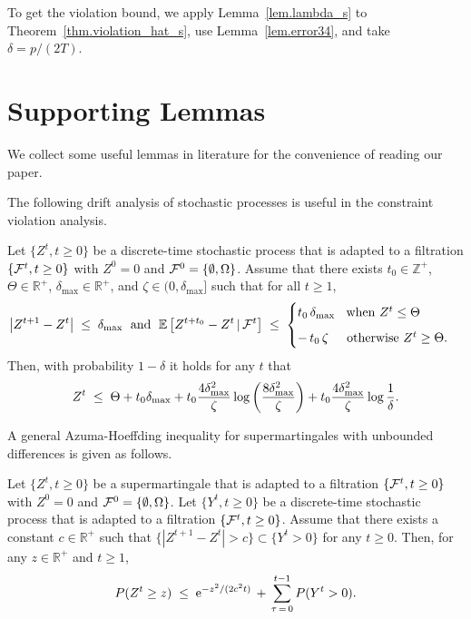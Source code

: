 \documentclass[12pt, final]{l4dc2023}
\begin{document}
To get the violation bound, we apply Lemma~\ref{lem.lambda_s} to Theorem~\ref{thm.violation_hat_s}, use Lemma~\ref{lem.error34}, and take $\delta=p/(2T)$.



\section{Supporting Lemmas}

We collect some useful lemmas in literature for the convenience of reading our paper. 

The following drift analysis of stochastic processes is useful in the constraint violation analysis.
\begin{lemma}\citep{yu2017online}\label{lem.drift} %
	Let $\{ Z^t, t\geq0 \}$ be a discrete-time stochastic process that is adapted to a filtration $\{{\mathcal{F}}^t, t\geq 0 \}$ with $Z^0 =0$ and ${\mathcal{F}}^0 = \{\emptyset,\Omega\}$. Assume that there exists $t_0 \in \mathbb{Z}^+$, $\Theta\in \mathbb{R}^+$, $ \delta_{\max}\in\mathbb{R}^+$, and $\zeta\in (0, \delta_{\max}]$ such that for all $t\geq 1$,
	\[
	\left| Z^{t+1}-Z^t \right| \;\leq\; \delta_{\max}
	\;\text{ and }\;
	\mathbb{E} \left[ Z^{t+t_0}-Z^t  \,\vert\, {\mathcal{F}}^t\right]
	\;\leq\;
	\begin{cases}
	t_0\, \delta_{\max} \;\; \text{ when } Z^t \leq \Theta
	\\[0.2cm]
	-\,t_0\,\zeta \;\;\;\; \text{ otherwise } Z^t \geq \Theta.
	\end{cases}
	\]
	Then, with probability $1-\delta$ it holds for any $t$ that 
	\[
	Z^t \;\leq \; \Theta + t_0 \delta_{\max} + t_0 \frac{4\delta_{\max}^2}{\zeta} \log \left(\frac{8\delta_{\max}^2}{\zeta}\right) + t_0 \frac{4\delta_{\max}^2}{\zeta} \log\frac{1}{\delta}.
	\]
\end{lemma}

A general Azuma-Hoeffding inequality for supermartingales with unbounded differences is given as follows.

\begin{lemma}\citep{yu2017online}\label{lem.azuma_general} %
	Let $\{ Z^t, t\geq0 \}$ be a supermartingale that is adapted to a filtration $\{{\mathcal{F}}^t, t\geq 0 \}$ with $Z^0 =0$ and ${\mathcal{F}}^0 = \{\emptyset,\Omega\}$. 
	Let $\{ Y^t, t\geq0 \}$ be a discrete-time stochastic process that is adapted to a filtration $\{{\mathcal{F}}^t, t\geq 0 \}$.
	Assume that there exists a constant $c\in\mathbb{R}^+$ such that $\{|Z^{t+1}-Z^t| > c\} \subset \{ Y^t>0 \}$ for any $t\geq 0$.
	Then, for any $z \in\mathbb{R}^+$ and $t\geq 1$,
	\[
	P( Z^t \geq z ) \;\leq\; {\rm e}^{-z^2/ (2c^2t)} \,+\, \sum_{\tau\,=\,0}^{t-1} P(Y^t>0).
	\]
\end{lemma}
\end{document}
